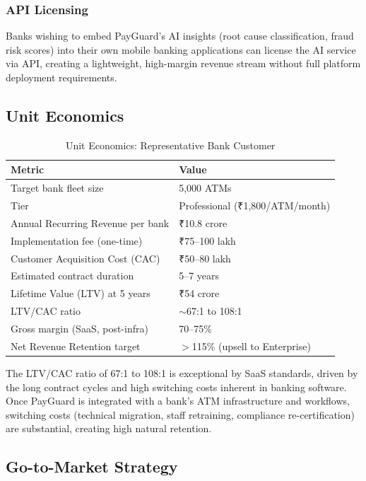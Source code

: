 \documentclass[12pt,a4paper]{article}
\newcommand{\inr}{₹}
\begin{document}
\subsubsection{API Licensing}

Banks wishing to embed PayGuard's AI insights (root cause classification, fraud risk scores)
into their own mobile banking applications can license the AI service via API, creating a
lightweight, high-margin revenue stream without full platform deployment requirements.

\subsection{Unit Economics}

\begin{table}[H]
\centering
\caption{Unit Economics: Representative Bank Customer}
\small
\begin{tabular}{@{}L{7cm} R{5cm}@{}}
\toprule
\textbf{Metric} & \textbf{Value} \\
\midrule
Target bank fleet size & 5,000 ATMs \\
Tier & Professional (\inr{}1,800/ATM/month) \\
Annual Recurring Revenue per bank & \inr{}10.8 crore \\
Implementation fee (one-time) & \inr{}75--100 lakh \\
\midrule
Customer Acquisition Cost (CAC) & \inr{}50--80 lakh \\
Estimated contract duration & 5--7 years \\
Lifetime Value (LTV) at 5 years & \inr{}54 crore \\
LTV/CAC ratio & $\sim$67:1 to 108:1 \\
\midrule
Gross margin (SaaS, post-infra) & 70--75\% \\
Net Revenue Retention target & $>$115\% (upsell to Enterprise) \\
\bottomrule
\end{tabular}
\end{table}

The LTV/CAC ratio of 67:1 to 108:1 is exceptional by SaaS standards, driven by the long
contract cycles and high switching costs inherent in banking software. Once PayGuard is
integrated with a bank's ATM infrastructure and workflows, switching costs (technical
migration, staff retraining, compliance re-certification) are substantial, creating high
natural retention.

\subsection{Go-to-Market Strategy}
\end{document}
